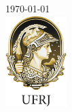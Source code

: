 \documentclass[12pt]{article}
\begin{document}
\begin{titlepage}
{\large \today}\\[2cm] %


\includegraphics[height=3.5cm]{logos/ufrj-logo.png}\\[1cm]


\vfill %

\end{titlepage}









%



\end{document}
